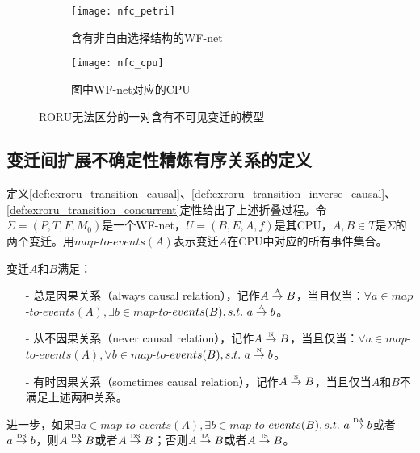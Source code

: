 \begin{figure}[htbp]
  \centering
  \begin{subfigure}{1\textwidth}
    \centering
    \texttt{[image: nfc\_petri]}
    \caption{含有非自由选择结构的WF-net}
    \label{fig:nfc_petri}
  \end{subfigure}
  \begin{subfigure}{1\textwidth}
    \vspace{1em}
    \centering
    \texttt{[image: nfc\_cpu]}
    \caption{图中WF-net对应的CPU}
    \label{fig:nfc_cpu}
  \end{subfigure}
  \caption{RORU无法区分的一对含有不可见变迁的模型}
  \label{fig:nfc_exroru}
\end{figure}

\subsection{变迁间扩展不确定性精炼有序关系的定义}\label{subsec:exroru_transition_def}
定义\ref{def:exroru_transition_causal}、\ref{def:exroru_transition_inverse_causal}、\ref{def:exroru_transition_concurrent}定性给出了上述折叠过程。令$\Sigma=(P,T,F,M_{0})$是一个WF-net，$U=(B,E,A,f)$是其CPU，$A,B\in T$是$\Sigma$的两个变迁。用$map$-$to$-$events(A)$表示变迁$A$在CPU中对应的所有事件集合。

\begin{definition}[变迁间扩展不确定性精炼因果关系]\label{def:exroru_transition_causal}
变迁$A$和$B$满足：
  \begin{itemize}
    \item[-] 总是因果关系（always causal relation），记作$A\overset{\text{\tiny{A}}}{\rightarrow}B$，当且仅当：$\forall a\in map$-$to$-$events(A),\exists b\in map$-$to$-$events(B),s.t.~a\overset{\text{\tiny{A}}}{\rightarrow}b$。
    \item[-] 从不因果关系（never causal relation），记作$A\overset{\text{\tiny{N}}}{\rightarrow}B$，当且仅当：$\forall a\in map$-$to$-$events(A),\forall b\in map$-$to$-$events(B),s.t.~a\overset{\text{\tiny{N}}}{\rightarrow}b$。
    \item[-] 有时因果关系（sometimes causal relation），记作$A\overset{\text{\tiny{S}}}{\rightarrow}B$，当且仅当$A$和$B$不满足上述两种关系。
  \end{itemize}
进一步，如果$\exists a\in map$-$to$-$events(A),\exists b\in map$-$to$-$events(B),s.t.~a\overset{\text{\tiny{DA}}}{\rightarrow}b$或者$a\overset{\text{\tiny{DS}}}{\rightarrow}b$，则$A\overset{\text{\tiny{DA}}}{\rightarrow}B$或者$A\overset{\text{\tiny{DS}}}{\rightarrow}B$；否则$A\overset{\text{\tiny{IA}}}{\rightarrow}B$或者$A\overset{\text{\tiny{IS}}}{\rightarrow}B$。
\end{definition}

